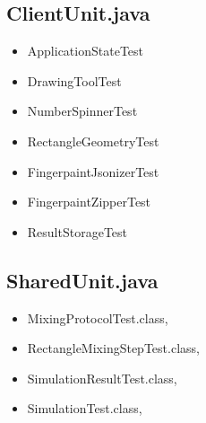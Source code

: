 \subsection{ClientUnit.java}
\begin{itemize}
\item ApplicationStateTest
\item 	DrawingToolTest
\item 	NumberSpinnerTest
\item 	RectangleGeometryTest
\item 	FingerpaintJsonizerTest
\item 	FingerpaintZipperTest
\item 	ResultStorageTest
\end{itemize}
\subsection{SharedUnit.java}
\begin{itemize}
\item	MixingProtocolTest.class,
\item	RectangleMixingStepTest.class,
\item	SimulationResultTest.class,
\item	SimulationTest.class,
\end{itemize}






